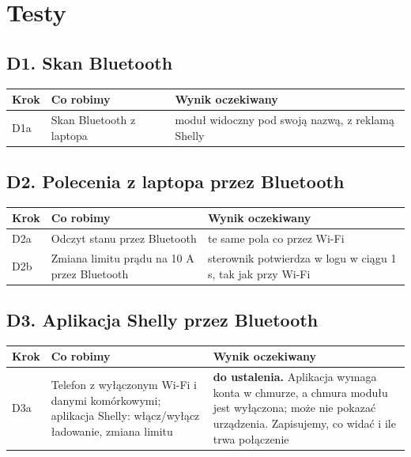 \documentclass[11pt,a4paper]{article}
\begin{document}
\section{Testy}

\subsection{D1. Skan Bluetooth}

\begin{longtable}{>{\raggedright\arraybackslash}p{3.00cm}>{\raggedright\arraybackslash}p{4.18cm}>{\raggedright\arraybackslash}p{8.10cm}}
\toprule
\rowcolor{apteallight}\textbf{Krok} & \textbf{Co robimy} & \textbf{Wynik oczekiwany} \\
\midrule\endhead
\bottomrule\endfoot
D1a & Skan Bluetooth z laptopa & moduł widoczny pod swoją nazwą, z reklamą Shelly \\
\end{longtable}

\subsection{D2. Polecenia z laptopa przez Bluetooth}

\begin{longtable}{>{\raggedright\arraybackslash}p{3.00cm}>{\raggedright\arraybackslash}p{5.40cm}>{\raggedright\arraybackslash}p{6.88cm}}
\toprule
\rowcolor{apteallight}\textbf{Krok} & \textbf{Co robimy} & \textbf{Wynik oczekiwany} \\
\midrule\endhead
\bottomrule\endfoot
D2a & Odczyt stanu przez Bluetooth & te same pola co przez Wi-Fi \\
D2b & Zmiana limitu prądu na 10 A przez Bluetooth & sterownik potwierdza w logu w ciągu 1 s, tak jak przy Wi-Fi \\
\end{longtable}

\subsection{D3. Aplikacja Shelly przez Bluetooth}

\begin{longtable}{>{\raggedright\arraybackslash}p{3.00cm}>{\raggedright\arraybackslash}p{5.96cm}>{\raggedright\arraybackslash}p{6.32cm}}
\toprule
\rowcolor{apteallight}\textbf{Krok} & \textbf{Co robimy} & \textbf{Wynik oczekiwany} \\
\midrule\endhead
\bottomrule\endfoot
D3a & Telefon z wyłączonym Wi-Fi i danymi komórkowymi; aplikacja Shelly: włącz/wyłącz ładowanie, zmiana limitu & \textbf{do ustalenia.} Aplikacja wymaga konta w chmurze, a chmura modułu jest wyłączona; może nie pokazać urządzenia. Zapisujemy, co widać i ile trwa połączenie \\
\end{longtable}
\end{document}

